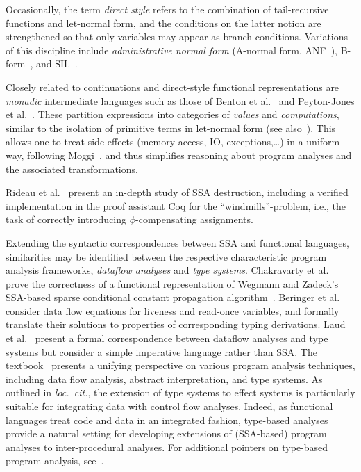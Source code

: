 Occasionally, the term \emph{direct style} refers to the combination
of tail-recursive functions and let-normal form, and the conditions on
the latter notion are strengthened so that only variables may 
appear as branch conditions. Variations of this discipline include
\emph{administrative normal form} (A-normal form,
ANF~\cite{DBLP:conf/pldi/FlanaganSDF93}),
B-form~\cite{DBLP:conf/pldi/TarditiMCSHL96}, and
SIL~\cite{DBLP:journals/jfp/TolmachO98}.

Closely related to continuations and direct-style functional
representations are \emph{monadic} intermediate languages such as
those of Benton et al.~\cite{BentonKennedyRussel:ICFP1998} and
Peyton-Jones et al.~\cite{PeytonJonesShieldsLT:POPL1998}. These
partition expressions into categories of \emph{values} and
\emph{computations}, similar to the isolation of primitive terms in
let-normal form (see also~\cite{Reynolds1974,Plotkin75}). This allows
one to treat side-effects (memory access, IO, exceptions,\ldots) in a
uniform way, following Moggi~\cite{Moggi1991}, and thus simplifies
reasoning about program analyses and the associated transformations.

Rideau et al.~\cite{DBLP:journals/jar/RideauSL08} present an in-depth
study of SSA destruction, including a verified implementation in the
proof assistant Coq for the ``windmills''-problem, i.e., the task of
correctly introducing $\phi$-compensating assignments.

Extending the syntactic correspondences between SSA and functional
languages, similarities may be identified between the respective
characteristic program analysis frameworks, \emph{dataflow analyses}
and \emph{type systems}.  Chakravarty et
al.~\cite{ChakravartyKZ:COCV03} prove the correctness of a functional
representation of Wegmann and Zadeck's SSA-based sparse conditional
constant propagation algorithm~\cite{WegmannZ:Toplas1991}.  Beringer
et al.~\cite{DBLP:journals/entcs/BeringerMS03} consider data flow
equations for liveness and read-once variables, and formally translate
their solutions to properties of corresponding typing derivations.
Laud et al.~\cite{DBLP:journals/tcs/LaudUV06} present a formal
correspondence between dataflow analyses and type systems but consider
a simple imperative language rather than SSA. The
textbook~\cite{NielsonNielsonHanking:POPA} presents a unifying
perspective on various program analysis techniques, including data
flow analysis, abstract interpretation, and type systems. As outlined
in \emph{loc.~cit.}, the extension of type systems to effect systems
is particularly suitable for integrating data with control flow
analyses. Indeed, as functional languages treat code and data in an
integrated fashion, type-based analyses provide a natural setting for
developing extensions of (SSA-based) program analyses to
inter-procedural analyses. For additional pointers on type-based
program analysis, see~\cite{Palsberg}.
%

